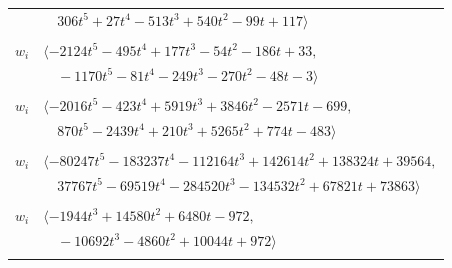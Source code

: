 \documentclass[11pt]{article}
\begin{document}
\begin{longtable}{@{}ll@{}}
 & $\quad 306t^{5}+27t^{4}-513t^{3}+540t^{2}-99t+117\rangle$\\
\addlinespace[2pt]
\multicolumn{2}{@{}p{0.97\textwidth}@{}}{$i=44$, $D_i=8$, $\rho_{ij}$: $1{:}1, \allowbreak 3{:}2, \allowbreak 5{:}1, \allowbreak 6{:}1, \allowbreak 13{:}2, \allowbreak 14{:}1, \allowbreak 19{:}1, \allowbreak 26{:}1, \allowbreak 33{:}2, \allowbreak 35{:}2, \allowbreak 36{:}2, \allowbreak 47{:}2$}\\
$w_i$ & $\langle -2124t^{5}-495t^{4}+177t^{3}-54t^{2}-186t+33,$\\
 & $\quad -1170t^{5}-81t^{4}-249t^{3}-270t^{2}-48t-3\rangle$\\
\addlinespace[2pt]
\multicolumn{2}{@{}p{0.97\textwidth}@{}}{$i=45$, $D_i=16$, $\rho_{ij}$: $1{:}2, \allowbreak 2{:}2, \allowbreak 15{:}2, \allowbreak 26{:}1, \allowbreak 33{:}2, \allowbreak 35{:}2, \allowbreak 37{:}1, \allowbreak 39{:}2, \allowbreak 49{:}2, \allowbreak 65{:}2, \allowbreak 67{:}1$}\\
$w_i$ & $\langle -2016t^{5}-423t^{4}+5919t^{3}+3846t^{2}-2571t-699,$\\
 & $\quad 870t^{5}-2439t^{4}+210t^{3}+5265t^{2}+774t-483\rangle$\\
\addlinespace[2pt]
\multicolumn{2}{@{}p{0.97\textwidth}@{}}{$i=46$, $D_i=16$, $\rho_{ij}$: $2{:}2, \allowbreak 3{:}1, \allowbreak 4{:}2, \allowbreak 7{:}2, \allowbreak 9{:}2, \allowbreak 13{:}2, \allowbreak 14{:}2, \allowbreak 15{:}2, \allowbreak 17{:}1, \allowbreak 21{:}2, \allowbreak 28{:}2, \allowbreak 29{:}1, \allowbreak 33{:}2, \allowbreak 36{:}1, \allowbreak 43{:}1, \allowbreak 49{:}1, \allowbreak 55{:}1, \allowbreak 65{:}1, \allowbreak 67{:}1$}\\
$w_i$ & $\langle -80247t^{5}-183237t^{4}-112164t^{3}+142614t^{2}+138324t+39564,$\\
 & $\quad 37767t^{5}-69519t^{4}-284520t^{3}-134532t^{2}+67821t+73863\rangle$\\
\addlinespace[2pt]
\multicolumn{2}{@{}p{0.97\textwidth}@{}}{$i=47$, $D_i=27$, $e_i=2$, $\rho_{ij}$: $20{:}2, \allowbreak 25{:}2, \allowbreak 27{:}2, \allowbreak 37{:}1, \allowbreak 42{:}2, \allowbreak 44{:}1, \allowbreak 51{:}1, \allowbreak 53{:}1$}\\
$w_i$ & $\langle -1944t^{3}+14580t^{2}+6480t-972,$\\
 & $\quad -10692t^{3}-4860t^{2}+10044t+972\rangle$\\
\addlinespace[2pt]
\multicolumn{2}{@{}p{0.97\textwidth}@{}}{$i=48$, $D_i=1$, $\rho_{ij}$: $7{:}1, \allowbreak 8{:}2, \allowbreak 22{:}2, \allowbreak 39{:}1, \allowbreak 42{:}1, \allowbreak 55{:}1, \allowbreak 64{:}2$}\\

\end{longtable}
\end{document}
